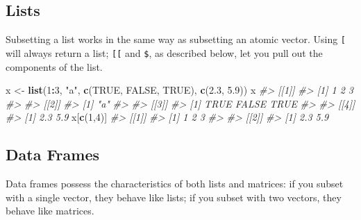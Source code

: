 \documentclass[]{book}
\newenvironment{Shaded}{\begin{snugshade}}{\end{snugshade}}
\newcommand{\CommentTok}[1]{\textcolor[rgb]{0.56,0.35,0.01}{\textit{#1}}}
\newcommand{\DecValTok}[1]{\textcolor[rgb]{0.00,0.00,0.81}{#1}}
\newcommand{\FloatTok}[1]{\textcolor[rgb]{0.00,0.00,0.81}{#1}}
\newcommand{\KeywordTok}[1]{\textcolor[rgb]{0.13,0.29,0.53}{\textbf{#1}}}
\newcommand{\NormalTok}[1]{#1}
\newcommand{\OperatorTok}[1]{\textcolor[rgb]{0.81,0.36,0.00}{\textbf{#1}}}
\newcommand{\OtherTok}[1]{\textcolor[rgb]{0.56,0.35,0.01}{#1}}
\newcommand{\StringTok}[1]{\textcolor[rgb]{0.31,0.60,0.02}{#1}}
\theoremstyle{definition}
\theoremstyle{definition}
\theoremstyle{definition}
\theoremstyle{remark}
\begin{document}
\hypertarget{lists-1}{%
\subsection{Lists}\label{lists-1}}

Subsetting a list works in the same way as subsetting an atomic vector.
Using \texttt{{[}} will always return a list; \texttt{{[}{[}} and
\texttt{\$}, as described below, let you pull out the components of the
list.

\begin{Shaded}
\begin{Highlighting}[]
\NormalTok{x <-}\StringTok{ }\KeywordTok{list}\NormalTok{(}\DecValTok{1}\OperatorTok{:}\DecValTok{3}\NormalTok{, }\StringTok{"a"}\NormalTok{, }\KeywordTok{c}\NormalTok{(}\OtherTok{TRUE}\NormalTok{, }\OtherTok{FALSE}\NormalTok{, }\OtherTok{TRUE}\NormalTok{), }\KeywordTok{c}\NormalTok{(}\FloatTok{2.3}\NormalTok{, }\FloatTok{5.9}\NormalTok{))}
\NormalTok{x}
\CommentTok{#> [[1]]}
\CommentTok{#> [1] 1 2 3}
\CommentTok{#> }
\CommentTok{#> [[2]]}
\CommentTok{#> [1] "a"}
\CommentTok{#> }
\CommentTok{#> [[3]]}
\CommentTok{#> [1]  TRUE FALSE  TRUE}
\CommentTok{#> }
\CommentTok{#> [[4]]}
\CommentTok{#> [1] 2.3 5.9}
\NormalTok{x[}\KeywordTok{c}\NormalTok{(}\DecValTok{1}\NormalTok{,}\DecValTok{4}\NormalTok{)]}
\CommentTok{#> [[1]]}
\CommentTok{#> [1] 1 2 3}
\CommentTok{#> }
\CommentTok{#> [[2]]}
\CommentTok{#> [1] 2.3 5.9}
\end{Highlighting}
\end{Shaded}

\hypertarget{data-frames-1}{%
\subsection{Data Frames}\label{data-frames-1}}

Data frames possess the characteristics of both lists and matrices: if
you subset with a single vector, they behave like lists; if you subset
with two vectors, they behave like matrices.
\end{document}
